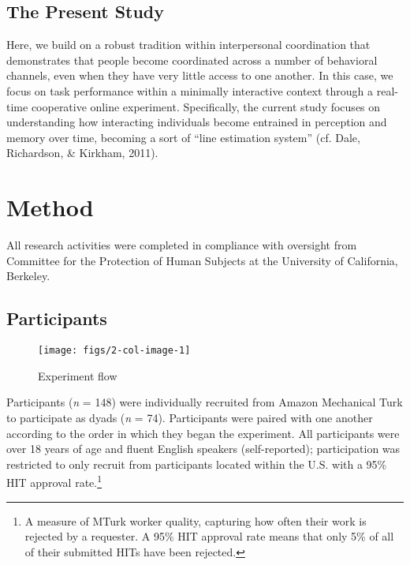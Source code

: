 \documentclass[10pt, letterpaper]{article}
\newenvironment{CodeChunk}{}{}
\begin{document}
\subsection{The Present Study}\label{the-present-study}

Here, we build on a robust tradition within interpersonal coordination
that demonstrates that people become coordinated across a number of
behavioral channels, even when they have very little access to one
another. In this case, we focus on task performance within a minimally
interactive context through a real-time cooperative online experiment.
Specifically, the current study focuses on understanding how interacting
individuals become entrained in perception and memory over time,
becoming a sort of ``line estimation system'' (cf. Dale, Richardson, \&
Kirkham, 2011).

\section{Method}\label{method}

All research activities were completed in compliance with oversight from
Committee for the Protection of Human Subjects at the University of
California, Berkeley.

\subsection{Participants}\label{participants}

\begin{CodeChunk}
\begin{figure*}[h]

{\centering \texttt{[image: figs/2-col-image-1]} 

}

\caption[Experiment flow]{Experiment flow}\label{fig:2-col-image}
\end{figure*}
\end{CodeChunk}

Participants (\emph{n} = 148) were individually recruited from Amazon
Mechanical Turk to participate as dyads (\emph{n} = 74). Participants
were paired with one another according to the order in which they began
the experiment. All participants were over 18 years of age and fluent
English speakers (self-reported); participation was restricted to only
recruit from participants located within the U.S. with a 95\% HIT
approval
rate.\footnote{A measure of MTurk worker quality, capturing how often their work is rejected by a requester. A 95\% HIT approval rate means that only 5\% of all of their submitted HITs have been rejected.}
\end{document}

